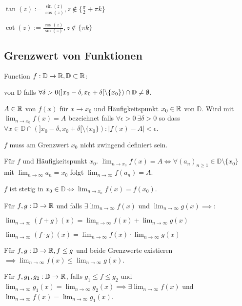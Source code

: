 \begin{compactdesc}
    \item[Tangens:] $\tan(z) := \frac{\sin(z)}{\cos(z)}, z \not\in \{\frac{\pi}{2} + \pi k\}$
    \item[Cotangens:] $\cot(z) := \frac{\cos(z)}{\sin(z)}, z \not\in \{\pi k\}$
\end{compactdesc}


\subsection{Grenzwert von Funktionen}
Function $f: \mathbb{D} \to \mathbb{R}, \mathbb{D} \subset \mathbb{R}$:
\begin{compactdesc}
    \item[Häufigkeitspunkt:] von $\mathbb{D}$ falls $\forall \delta > 0 (]x_0 - \delta, x_0 + \delta[ \setminus \{x_0\} ) \cap \mathbb{D} \neq \emptyset$.
    \item[Grenzwert:] $A \in \mathbb{R}$ von $f(x)$ für $x \to x_0$ und Häufigkeitspunkt $x_0 \in \mathbb{R}$ von $\mathbb{D}$. Wird mit $\lim_{n \to x_0} f(x) = A$ bezeichnet falls $\forall \epsilon > 0 \ \exists \delta > 0$ so dass $\forall x \in \mathbb{D} \cap (]x_0 - \delta, x_0 + \delta[ \setminus \{x_0\}) : |f(x) - A| < \epsilon$.
\end{compactdesc}
\begin{compactitem}
    \item $f$ muss am Grenzwert $x_0$ nicht zwingend definiert sein.
    \item Für $f$ und Häufigkeitspunkt $x_0$. $\lim_{n \to x_0}f(x) = A \iff \forall (a_n)_{n \ge 1} \in \mathbb{D} \setminus \{x_0\}$ mit $\lim_{n \to \infty} a_n = x_0$ folgt $\lim_{n \to \infty}f(a_n) = A$.
    \item $f$ ist stetig in $x_0 \in \mathbb{D} \iff \lim_{n \to x_0} f(x) = f(x_0)$.
    \item Für $f,g: \mathbb{D} \to \mathbb{R}$ und falls $\exists \lim_{n \to \infty} f(x)$ und $\lim_{n \to \infty} g(x) \implies$:
        \begin{inparaitem}
            \item $\lim_{n \to \infty} (f + g)(x) = \lim_{n \to \infty} f(x) + \lim_{n \to \infty} g(x)$
            \item $\lim_{n \to \infty} (f \cdot g)(x) = \lim_{n \to \infty} f(x) \cdot \lim_{n \to \infty} g(x)$
        \end{inparaitem}
    \item Für $f,g: \mathbb{D} \to \mathbb{R}, f \le g$ und beide Grenzwerte existieren $\implies \lim_{n \to \infty} f(x) \le \lim_{n \to \infty} g(x)$.
    \item Für $f,g_1, g_2: \mathbb{D} \to \mathbb{R}$, falls $g_1 \le f \le g_2$ und $\lim_{n \to \infty} g_1(x) = \lim_{n \to \infty} g_2(x) \implies \exists \lim_{n \to \infty} f(x)$ und $\lim_{n \to \infty} f(x) = \lim_{n \to \infty} g_1(x)$.
\end{compactitem}

